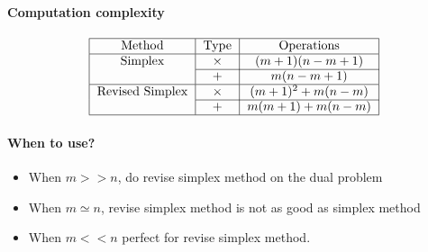             \paragraph{Computation complexity}
                \begin{align}
                    \begin{tabular}{|c|c|c|}
                        \hline Method & Type & Operations\\
                        \hline Simplex & $\times$ & $(m+1)(n-m+1)$\\
                        \cline{2-3} & $+$ & $m(n-m+1)$\\
                        \hline Revised Simplex & $\times$ & $(m+1)^2+m(n-m)$ \\
                        \cline{2-3} & $+$ & $m(m+1)+m(n-m)$ \\
                        \hline
                    \end{tabular} \nonumber
                \end{align}

            \paragraph{When to use?}
                \begin{itemize}
                    \item When $m >> n$, do revise simplex method on the dual problem
                    \item When $m \simeq n$, revise simplex method is not as good as simplex method
                    \item When $m << n$ perfect for revise simplex method.
                \end{itemize}
                        
